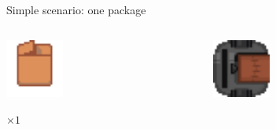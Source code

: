 \begin{frame}[fragile]{Simple scenario: one package}
    \centering
    \begin{columns}
        \begin{column}{0.5\textwidth}
            \centering
            \includegraphics[width = 0.3\textwidth]{images/godot/package.png}
            
            \LARGE \emph{$\times 1$}
        \end{column}
        \begin{column}{0.5\textwidth}
            \centering
            \includegraphics[width = 0.3\textwidth]{images/godot/robot_texture.png}
            

\end{column}
\end{columns}
\end{frame}
